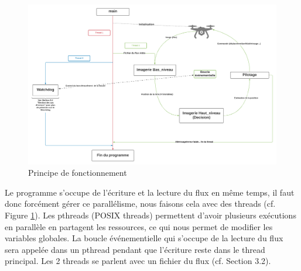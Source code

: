 \documentclass[12pt]{article}
\begin{document}
\begin{figure}[H]
\centering
\includegraphics[width=15cm]{Fonctionnement_simple.png}
\caption{Principe de fonctionnement}
\label{fig:fct}
\end{figure}
Le programme s'occupe de l'écriture et la lecture du flux en même temps, il faut donc forcément gérer ce parallélisme, nous faisons cela avec des threads (cf. Figure \ref{fig:fct}). Les pthreads (POSIX threads\cite{pthreads}) permettent d'avoir plusieurs exécutions en parallèle en partagent les ressources, ce qui nous permet de modifier les variables globales.
La boucle événementielle qui s'occupe de la lecture du flux sera appelée dans un pthread pendant que l'écriture reste dans le thread principal. Les 2 threads se parlent avec un fichier du flux (cf. Section 3.2).
\end{document}
